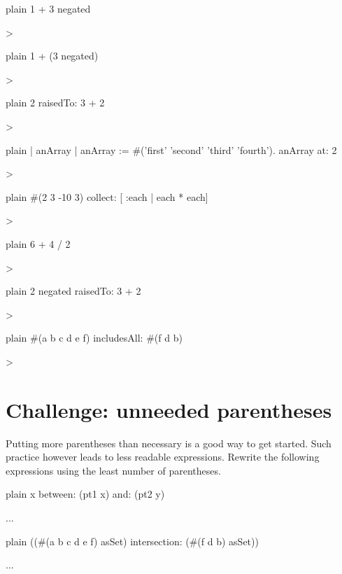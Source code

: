 \documentclass[10pt,twoside,english]{_support/latex/sbabook/sbabook}
\begin{document}
\begin{displaycode}{plain}
1 + 3 negated

>
\end{displaycode}

\begin{displaycode}{plain}
1 + (3 negated)

>
\end{displaycode}

\begin{displaycode}{plain}
2 raisedTo: 3 + 2

>
\end{displaycode}

\begin{displaycode}{plain}
| anArray |
anArray := #('first' 'second' 'third' 'fourth').
anArray at: 2


> 
\end{displaycode}

\begin{displaycode}{plain}
#(2 3 -10 3) collect: [ :each | each * each]

>
\end{displaycode}

\begin{displaycode}{plain}
6 + 4 / 2

>
\end{displaycode}

\begin{displaycode}{plain}
2 negated raisedTo: 3 + 2

>
\end{displaycode}

\begin{displaycode}{plain}
#(a b c d e f) includesAll: #(f d b)

>
\end{displaycode}
\section{Challenge: unneeded parentheses }
Putting more  parentheses than necessary is  a good way  to get started. Such  practice however leads to  less readable expressions. Rewrite the following expressions using the least number of parentheses. 

\begin{displaycode}{plain}
x between: (pt1 x) and: (pt2 y)


 ...
\end{displaycode}

\begin{displaycode}{plain}
((#(a b c d e f) asSet) intersection: (#(f d b) asSet))


 ...
\end{displaycode}
\end{document}
